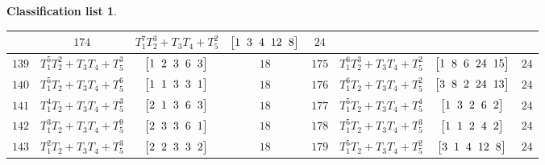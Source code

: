 \documentclass[pdftex]{sigma}%
\theoremstyle{definition}
\newtheorem{class-list}[thm]{Classification list}
\numberwithin{equation}{section}
\begin{document}
\begin{class-list}
\begin{table}[t!]
\begin{tabu}{c|c|c|c||c|c|c|c}
&${174}$&${T_{1}^{7}T_{2}^{3}+T_{3}T_{4}+T_{5}^{2}}$
&$\arraycolsep=1mm\begin{bmatrix}{1} & {3} & {4} & {12} & {8}\end{bmatrix}$&${24}$
\\
\hline
${139}$&${T_{1}^{5}T_{2}^{2}+T_{3}T_{4}+T_{5}^{3}}$
&$\arraycolsep=1mm\begin{bmatrix}{1} & {2} & {3} & {6} & {3}\end{bmatrix}$&${18}$
&${175}$&${T_{1}^{6}T_{2}^{3}+T_{3}T_{4}+T_{5}^{2}}$
&$\arraycolsep=1mm\begin{bmatrix}{1} & {8} & {6} & {24} & {15}\end{bmatrix}$&${24}$
\\
\hline
${140}$&${T_{1}^{5}T_{2}+T_{3}T_{4}+T_{5}^{6}}$
&$\arraycolsep=1mm\begin{bmatrix}{1} & {1} & {3} & {3} & {1}\end{bmatrix}$&${18}$
&${176}$&${T_{1}^{6}T_{2}+T_{3}T_{4}+T_{5}^{2}}$
&$\arraycolsep=1mm\begin{bmatrix}{3} & {8} & {2} & {24} & {13}\end{bmatrix}$&${24}$
\\
\hline
${141}$&${T_{1}^{4}T_{2}+T_{3}T_{4}+T_{5}^{3}}$
&$\arraycolsep=1mm\begin{bmatrix}{2} & {1} & {3} & {6} & {3}\end{bmatrix}$&${18}$
&${177}$&${T_{1}^{5}T_{2}+T_{3}T_{4}+T_{5}^{4}}$
&$\arraycolsep=1mm\begin{bmatrix}{1} & {3} & {2} & {6} & {2}\end{bmatrix}$&${24}$
\\
\hline
${142}$&${T_{1}^{3}T_{2}+T_{3}T_{4}+T_{5}^{9}}$
&$\arraycolsep=1mm\begin{bmatrix}{2} & {3} & {3} & {6} & {1}\end{bmatrix}$&${18}$
&${178}$&${T_{1}^{5}T_{2}+T_{3}T_{4}+T_{5}^{3}}$
&$\arraycolsep=1mm\begin{bmatrix}{1} & {1} & {2} & {4} & {2}\end{bmatrix}$&${24}$
\\
\hline
${143}$&${T_{1}^{2}T_{2}+T_{3}T_{4}+T_{5}^{3}}$
&$\arraycolsep=1mm\begin{bmatrix}{2} & {2} & {3} & {3} & {2}\end{bmatrix}$&${18}$
&${179}$&${T_{1}^{5}T_{2}+T_{3}T_{4}+T_{5}^{2}}$
&$\arraycolsep=1mm\begin{bmatrix}{3} & {1} & {4} & {12} & {8}\end{bmatrix}$&${24}$
\\

\end{tabu}
\end{table}
\end{class-list}
\end{document}
